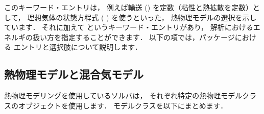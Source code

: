 このキーワード・エントリは，
例えば輸送 () を定数（粘性と熱拡散を定数）として，
理想気体の状態方程式 (%
%
%
) を使うといった，
熱物理モデルの選択を示しています．
それに加えて
%
%
というキーワード・エントリがあり，
解析におけるエネルギの扱い方を指定することができます．
以下の項では，パッケージにおける
エントリと選択肢について説明します．


\subsection{熱物理モデルと混合気モデル}
\label{ssec:7.1.1@3.0.1}
熱物理モデリングを使用しているソルバは，
それぞれ特定の熱物理モデルクラスのオブジェクトを使用します．
モデルクラスを以下にまとめます．
